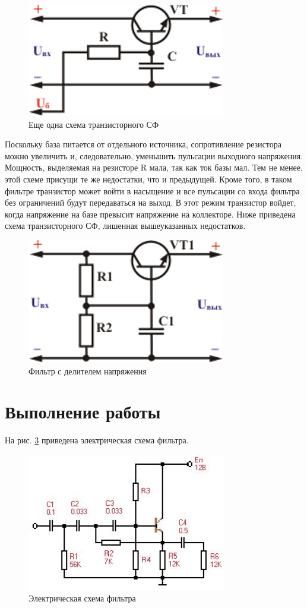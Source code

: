 \documentclass[a4paper,14pt]{article}
\begin{document}
\begin{figure}[H]
	\centering
	\includegraphics[width=0.5\linewidth]{image/method_2}
	\caption{Еще одна схема транзисторного СФ}
	\label{fig:method2}
\end{figure}

Поскольку база питается от отдельного источника, сопротивление резистора можно увеличить и, следовательно, уменьшить пульсации выходного напряжения.
Мощность, выделяемая на резисторе R мала, так как ток базы мал.
Тем не менее, этой схеме присущи те же недостатки, что и предыдущей.
Кроме того, в таком фильтре транзистор может войти в насыщение и все пульсации со входа фильтра без ограничений будут передаваться на выход.
В этот режим транзистор войдет, когда напряжение на базе превысит напряжение на коллекторе.
Ниже приведена схема транзисторного СФ, лишенная вышеуказанных недостатков.

\begin{figure}[H]
	\centering
	\includegraphics[width=0.5\linewidth]{image/method_3}
	\caption{Фильтр с делителем напряжения}
	\label{fig:method3}
\end{figure}

\section{Выполнение работы}

На рис. \ref{fig:shem} приведена электрическая схема фильтра.

\begin{figure}[H]
	\centering
	\includegraphics[width=0.7\linewidth]{image/shem}
	\caption{Электрическая схема фильтра}
	\label{fig:shem}
\end{figure}
\end{document}
